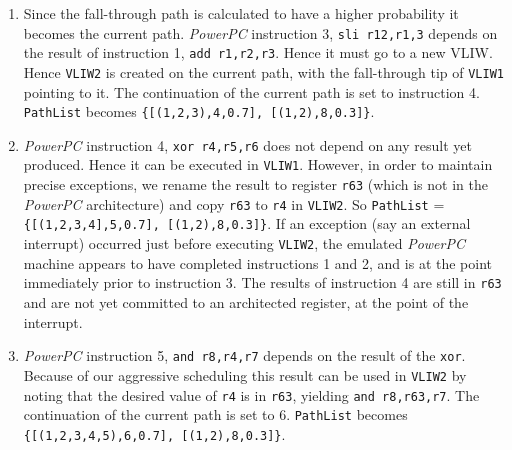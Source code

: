 \begin{small}
\begin{enumerate}
\item Since the fall-through path is calculated to have a
higher probability it becomes the current path.  {\it PowerPC}
instruction 3, {\tt sli r12,r1,3} depends on the result of
instruction 1, {\tt add r1,r2,r3}.  Hence it must go to a new VLIW.
Hence {\tt VLIW2} is created on the current path, with the
fall-through tip of {\tt VLIW1} pointing to it. The continuation of
the current path is set to instruction 4.  {\tt PathList} becomes
{\tt \{[(1,2,3),4,0.7], [(1,2),8,0.3]\}}.

\item {\it PowerPC} instruction 4, {\tt xor r4,r5,r6} does not depend
on any result yet produced.  Hence it can be executed in {\tt VLIW1}.
However, in order to maintain precise exceptions, we rename the
result to register {\tt r63} (which is not in the {\it PowerPC}
architecture) and copy {\tt r63} to {\tt r4} in {\tt VLIW2}.  So
{\tt PathList} = {\tt \{[(1,2,3,4],5,0.7], [(1,2),8,0.3]\}}.  If an
exception (say an external interrupt) occurred just before executing
{\tt VLIW2}, the emulated {\it PowerPC} machine appears to have
completed instructions 1 and 2, and is at the point immediately
prior to instruction 3.  The results of instruction 4 are still in
{\tt r63} and are not yet committed to an architected register, at
the point of the interrupt.

\item {\it PowerPC} instruction 5, {\tt and r8,r4,r7} depends on the
result of the {\tt xor}.  Because of our aggressive scheduling this
result can be used in {\tt VLIW2} by noting that the desired value
of {\tt r4} is in {\tt r63}, yielding {\tt and r8,r63,r7}.  The
continuation of the current path is set to 6.  {\tt PathList}
becomes {\tt \{[(1,2,3,4,5),6,0.7], [(1,2),8,0.3]\}}.


\end{enumerate}
\end{small}
